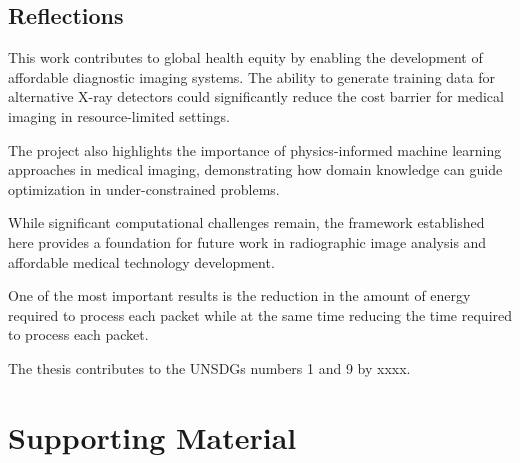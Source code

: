 \documentclass[nomenclature, english, bibtex]{kththesis}
\newcommand*{\warningExpl}[1]{\todo[inline, backgroundcolor=kth-lightred40]{#1}} %
\numberwithin{listing}{chapter}
\begin{document}
\section{Reflections}
\label{sec:reflections}

This work contributes to global health equity by enabling the development of affordable diagnostic imaging systems. The ability to generate training data for alternative X-ray detectors could significantly reduce the cost barrier for medical imaging in resource-limited settings.

The project also highlights the importance of physics-informed machine learning approaches in medical imaging, demonstrating how domain knowledge can guide optimization in under-constrained problems.

While significant computational challenges remain, the framework established here provides a foundation for future work in radiographic image analysis and affordable medical technology development.


One of the most important results is the reduction in the amount of
energy required to process each packet while at the same time reducing the
time required to process each packet.

The thesis contributes to the \gls{UN}\enspace\glspl{SDG} numbers 1 and 9 by
xxxx.



\cleardoublepage
\renewcommand{\bibname}{References}


\ifbiblatex
    \printbibliography[heading=bibintoc]
\else
    
\fi



\appendix
\renewcommand{\chaptermark}[1]{\markboth{Appendix \thechapter\relax:\thinspace\relax#1}{}}
\chapter{Supporting Material}
\end{document}
